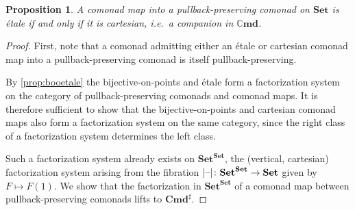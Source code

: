 \documentclass[11pt, oneside, article]{memoir}
\theoremstyle{plain}
\newtheorem{proposition}[theorem]{Proposition}
\theoremstyle{definition}
\theoremstyle{remark}
\DeclareMathOperator{\El}{El}
\DeclarePairedDelimiter{\abs}{\lvert}{\rvert}
\newcommand{\dash}{{\mathord{\text{--}}}}
\newcommand{\namedcat}[1]{\mathbf{#1}}
\newcommand{\Set}{\namedcat{Set}}
\newcommand{\Cmd}{\mathbb{C}\namedcat{md}}
\newcommand{\CmdSet}{\Cmd}
\newcommand{\Com}{\namedcat{Cmd}^\sharp}
\newcommand{\ComSet}{\Com}
\newcommand{\CoalgOn}[2]{{#2}^{#1}}
\newcommand{\CoalgSet}[1]{\CoalgOn{#1}{\Set}}
\newcommand{\pts}[1]{{\abs{#1}}}
\newcommand{\one}[1]{\pts{#1}}
\newcommand{\com}[2]{{#1}^{#2}}
\newcommand{\fun}[2]{{#2}^{#1}}
\newcommand{\End}[1]{\fun{#1}{#1}}
\newcommand{\SetSet}{\End{\Set}}
\newcommand{\cmnd}[1]{{#1}}
\newcommand{\cC}{\cmnd{C}}
\newcommand{\CSet}{\CoalgSet{\cC}}
\begin{document}

\begin{proposition}\label{prop:cartesianetale}
  A comonad map into a pullback-preserving comonad on $\Set$ is
  \'etale if and only if it is cartesian, i.e.\ a companion in
  $\CmdSet$.
\end{proposition}
\begin{proof}
  First, note that a comonad admitting either an \'etale or cartesian
  comonad map into a pullback-preserving comonad is itself
  pullback-preserving.
  
  By \cref{prop:booetale} the bijective-on-points and \'etale form a
  factorization system on the category of pullback-preserving comonads
  and comonad maps. It is therefore sufficient to show that the
  bijective-on-points and cartesian comonad maps also form a
  factorization system on the same category, since the right class of
  a factorization system determines the left class.

  Such a factorization system already exists on $\SetSet$, the
  (vertical, cartesian) factorization system arising from the
  fibration $\one{\dash} \colon \SetSet \to \Set$ given by
  $F \mapsto F(1)$. We show that the factorization in $\SetSet$ of
  a comonad map between pullback-preserving comonads lifts to
  $\ComSet$.


\end{proof}
\end{document}
